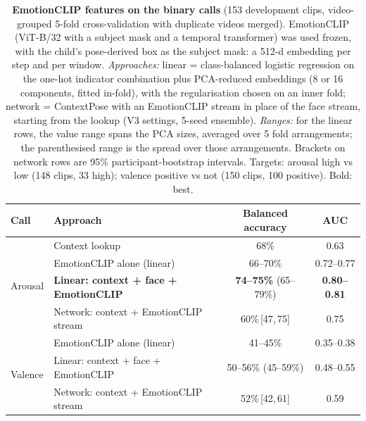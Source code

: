 \documentclass[11pt]{article}
\newcommand{\best}[1]{\textbf{#1}}
\newcommand{\ci}[2]{\,[#1,\,#2]}
\begin{document}
\begin{table}[!htbp]
\centering
\caption{\textbf{EmotionCLIP features on the binary calls} (153 development clips, video-grouped 5-fold cross-validation with duplicate videos merged). EmotionCLIP (ViT-B/32 with a subject mask and a temporal transformer) was used frozen, with the child's pose-derived box as the subject mask: a 512-d embedding per step and per window.
\emph{Approaches:} linear = class-balanced logistic regression on the one-hot indicator combination plus PCA-reduced embeddings (8 or 16 components, fitted in-fold), with the regularisation chosen on an inner fold; network = ContextPose with an EmotionCLIP stream in place of the face stream, starting from the lookup (V3 settings, 5-seed ensemble).
\emph{Ranges:} for the linear rows, the value range spans the PCA sizes, averaged over 5 fold arrangements; the parenthesised range is the spread over those arrangements. Brackets on network rows are 95\% participant-bootstrap intervals. Targets: arousal high vs low (148 clips, 33 high); valence positive vs not (150 clips, 100 positive). Bold: best.}
\label{tab:eclip}
\begin{tabular}{llcc}
\toprule
Call & Approach & Balanced accuracy & AUC \\
\midrule
\multirow{4}{*}{Arousal}
 & Context lookup & 68\% & 0.63 \\
 & EmotionCLIP alone (linear) & 66--70\% & 0.72--0.77 \\
 & \best{Linear: context + face + EmotionCLIP} & \best{74--75\%} (65--79\%) & \best{0.80--0.81} \\
 & Network: context + EmotionCLIP stream & 60\%\ci{47}{75} & 0.75 \\
\midrule
\multirow{3}{*}{Valence}
 & EmotionCLIP alone (linear) & 41--45\% & 0.35--0.38 \\
 & Linear: context + face + EmotionCLIP & 50--56\% (45--59\%) & 0.48--0.55 \\
 & Network: context + EmotionCLIP stream & 52\%\ci{42}{61} & 0.59 \\
\bottomrule
\end{tabular}
\end{table}
\end{document}
